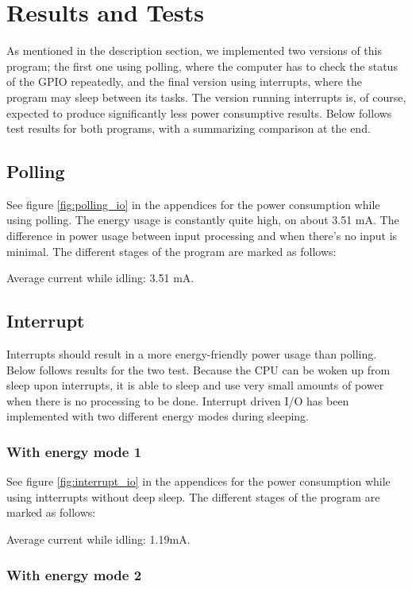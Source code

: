 \section{Results and Tests}

As mentioned in the description section, we implemented two versions of this program; the first one using polling, where the computer has to check the status of the GPIO repeatedly, and the final version using interrupts, where the program may sleep between its tasks. The version running interrupts is, of course, expected to produce significantly less power consumptive results. Below follows test results for both programs, with a summarizing comparison at the end.

\subsection{Polling}

See figure \ref{fig:polling_io} in the appendices for the power consumption while using polling. The energy usage is constantly quite high, on about 3.51 mA. The difference in power usage between input processing and when there's no input is minimal.
The different stages of the program are marked as follows:

Average current while idling: 3.51 mA.

\subsection{Interrupt}

Interrupts should result in a more energy-friendly power usage than polling. Below follows results for the two test.
Because the CPU can be woken up from sleep upon interrupts, it is able to sleep and use very small amounts of power when there is no processing to be done. Interrupt driven I/O has been implemented with two different energy modes during sleeping.

\subsubsection{With energy mode 1}

See figure \ref{fig:interrupt_io} in the appendices for the power consumption while using intterrupts without deep sleep. The different stages of the program are marked as follows:

Average current while idling: 1.19mA.

\subsubsection{With energy mode 2}

